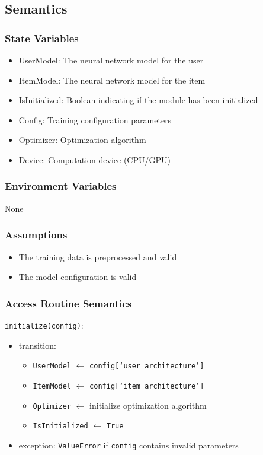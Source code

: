 \documentclass[12pt, titlepage]{article}
\begin{document}
\subsection{Semantics}

\subsubsection{State Variables}
\begin{itemize}
  \item UserModel: The neural network model for the user
  \item ItemModel: The neural network model for the item 
  \item IsInitialized: Boolean indicating if the module has been initialized
  \item Config: Training configuration parameters
  \item Optimizer: Optimization algorithm
  \item Device: Computation device (CPU/GPU)
\end{itemize}

\subsubsection{Environment Variables}

None

\subsubsection{Assumptions}

\begin{itemize}
  \item The training data is preprocessed and valid
  \item The model configuration is valid
\end{itemize}

\subsubsection{Access Routine Semantics}

\noindent \texttt{initialize(config)}:
\begin{itemize}
\item transition:
\begin{itemize}
  \item \texttt{UserModel} $\leftarrow$ \texttt{config[`user\_architecture']}
  \item \texttt{ItemModel} $\leftarrow$ \texttt{config[`item\_architecture']}
  \item \texttt{Optimizer} $\leftarrow$ initialize optimization algorithm
  \item \texttt{IsInitialized} $\leftarrow$ \texttt{True}
\end{itemize}
\item exception: \texttt{ValueError} if \texttt{config} contains invalid parameters
\end{itemize}
\end{document}
